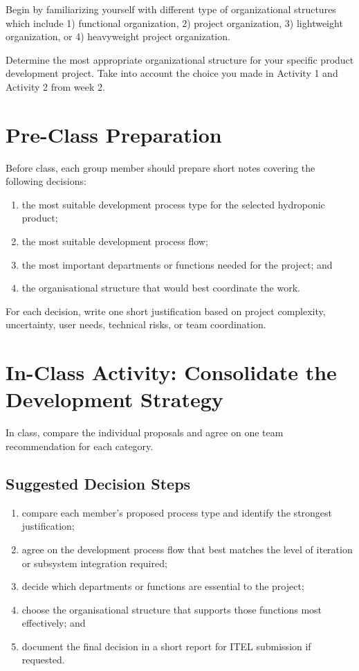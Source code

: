 Begin by familiarizing yourself with different type of organizational structures which include 1) functional organization, 2) project organization, 3) lightweight organization, or 4) heavyweight project organization.

Determine the most appropriate organizational structure for your specific product development project. Take into account the choice you made in Activity 1 and Activity 2 from week 2.


\section{Pre-Class Preparation}

Before class, each group member should prepare short notes covering the following decisions:
\begin{enumerate}
    \item the most suitable development process type for the selected hydroponic product;
    \item the most suitable development process flow;
    \item the most important departments or functions needed for the project; and
    \item the organisational structure that would best coordinate the work.
\end{enumerate}

For each decision, write one short justification based on project complexity, uncertainty, user needs, technical risks, or team coordination.

\section{In-Class Activity: Consolidate the Development Strategy}

In class, compare the individual proposals and agree on one team recommendation for each category.

\subsection{Suggested Decision Steps}
\begin{enumerate}
    \item compare each member's proposed process type and identify the strongest justification;
    \item agree on the development process flow that best matches the level of iteration or subsystem integration required;
    \item decide which departments or functions are essential to the project;
    \item choose the organisational structure that supports those functions most effectively; and
    \item document the final decision in a short report for ITEL submission if requested.
\end{enumerate}


